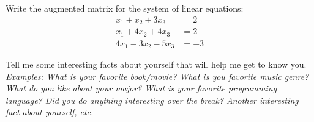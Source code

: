 \documentclass[10pt]{exam}
\begin{document}
\begin{questions}
\question[1]
Write the augmented matrix for the system of linear equations: \\
\begin{align*}
x_1 + x_2 +3x_3 &= 2  \\
x_1 + 4x_2 +4x_3 &= 2 \\
4x_1 - 3x_2 -5x_3 &= -3   
\end{align*}

\vfill
\question[2] 
Tell me some interesting facts about yourself that will help me get to know you. {\it Examples:  What is your favorite book/movie?  What is you favorite music genre? What do you like about your major?  What is your favorite programming language?  Did you do anything interesting over the break?  Another interesting fact about yourself, etc.}   
\vfill

\end{questions}
\end{document}
